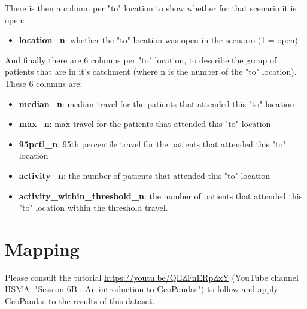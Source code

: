 \documentclass{article}
\begin{document}
\begin{flushleft}
\vspace{\baselineskip}

There is then a column per "to" location to show whether for that scenario it is open:
\begin{itemize}
	\item \textbf{location\_n}: whether the "to" location was open in the scenario (1 = open)
\end{itemize}

\vspace{\baselineskip}
And finally there are 6 columns per "to" location, to describe the group of patients that are in it's catchment (where n is the number of the "to" location). These 6 columns are:
\begin{itemize}
	\item \textbf{median\_n}: median travel for the patients that attended this "to" location
	\item \textbf{max\_n}: max travel for the patients that attended this "to" location
	\item \textbf{95pctl\_n}: 95th percentile travel for the patients that attended this "to" location
	\item \textbf{activity\_n}: the number of patients that attended this "to" location
	\item \textbf{activity\_within\_threshold\_n}: the number of patients that attended this "to" location within the threshold travel.
\end{itemize}

\section{Mapping}
Please consult the tutorial \url{https://youtu.be/QEZFnERpZxY} (YouTube channel HSMA: "Session 6B : An introduction to GeoPandas") to follow and apply GeoPandas to the results of this dataset.

\end{flushleft}
\end{document}

